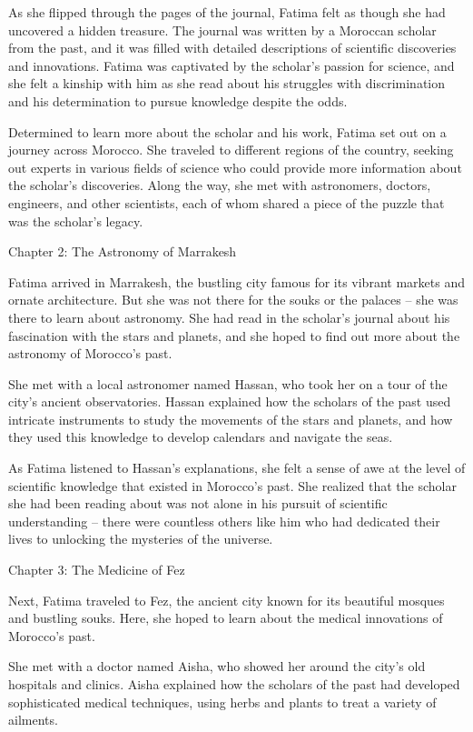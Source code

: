 \documentclass[11,5pt]{report}
\begin{document}
\begin{spacing}{2}
As she flipped through the pages of the journal, Fatima felt as though she had uncovered a hidden treasure. The journal was written by a Moroccan scholar from the past, and it was filled with detailed descriptions of scientific discoveries and innovations. Fatima was captivated by the scholar's passion for science, and she felt a kinship with him as she read about his struggles with discrimination and his determination to pursue knowledge despite the odds.

Determined to learn more about the scholar and his work, Fatima set out on a journey across Morocco. She traveled to different regions of the country, seeking out experts in various fields of science who could provide more information about the scholar's discoveries. Along the way, she met with astronomers, doctors, engineers, and other scientists, each of whom shared a piece of the puzzle that was the scholar's legacy.

Chapter 2: The Astronomy of Marrakesh

Fatima arrived in Marrakesh, the bustling city famous for its vibrant markets and ornate architecture. But she was not there for the souks or the palaces – she was there to learn about astronomy. She had read in the scholar's journal about his fascination with the stars and planets, and she hoped to find out more about the astronomy of Morocco's past.

She met with a local astronomer named Hassan, who took her on a tour of the city's ancient observatories. Hassan explained how the scholars of the past used intricate instruments to study the movements of the stars and planets, and how they used this knowledge to develop calendars and navigate the seas.

As Fatima listened to Hassan's explanations, she felt a sense of awe at the level of scientific knowledge that existed in Morocco's past. She realized that the scholar she had been reading about was not alone in his pursuit of scientific understanding – there were countless others like him who had dedicated their lives to unlocking the mysteries of the universe.

Chapter 3: The Medicine of Fez

Next, Fatima traveled to Fez, the ancient city known for its beautiful mosques and bustling souks. Here, she hoped to learn about the medical innovations of Morocco's past.

She met with a doctor named Aisha, who showed her around the city's old hospitals and clinics. Aisha explained how the scholars of the past had developed sophisticated medical techniques, using herbs and plants to treat a variety of ailments.


\end{spacing}
\end{document}
